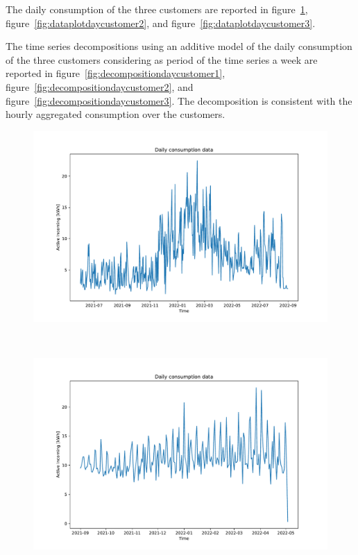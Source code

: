 The daily consumption of the three customers are reported in figure~\ref{fig:dataplotdaycustomer1}, figure~\ref{fig:dataplotdaycustomer2}, and figure~\ref{fig:dataplotdaycustomer3}.

The time series decompositions using an additive model of the daily consumption of the three customers considering as period of the time series a week are reported in figure~\ref{fig:decompositiondaycustomer1}, figure~\ref{fig:decompositiondaycustomer2}, and figure~\ref{fig:decompositiondaycustomer3}.
The decomposition is consistent with the hourly aggregated consumption over the customers.

\begin{figure}[H]
\begin{minipage}[b]{8.5cm}
\centering
\includegraphics[width=1\textwidth]{images/baseline/data_day_aggregated_plot_customer1}
\label{fig:dataplotdaycustomer1}
\end{minipage}
\ \hspace{2mm} \
\begin{minipage}[b]{8.5cm}
\centering
\includegraphics[width=1\textwidth]{images/baseline/data_day_aggregated_plot_customer2}

\end{minipage}
\end{figure}

